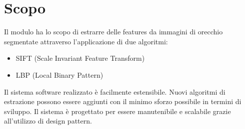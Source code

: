 \chapter{Scopo}
Il modulo ha lo scopo di estrarre delle features da immagini di orecchio segmentate attraverso l'applicazione di due algoritmi:
\begin{itemize}
	\item SIFT (Scale Invariant Feature Transform)
	\item LBP (Local Binary Pattern)
\end{itemize}
Il sistema software realizzato è facilmente estensibile. Nuovi algoritmi di estrazione possono essere aggiunti con il minimo sforzo possibile in termini di sviluppo.
Il sistema è progettato per essere manutenibile e scalabile grazie all'utilizzo di design pattern.